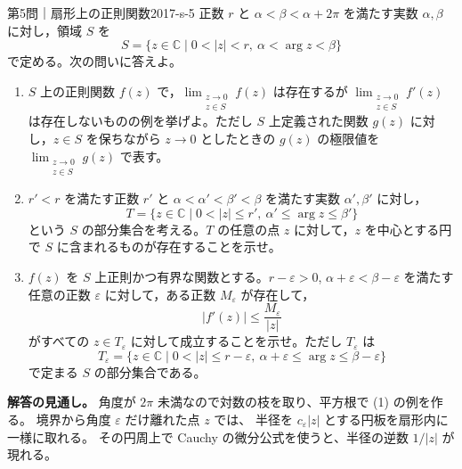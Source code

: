 \begin{problem}{第5問｜扇形上の正則関数}{2017-s-5}
正数 $r$ と $\alpha<\beta<\alpha+2\pi$ を満たす実数 $\alpha,\beta$ に対し，領域 $S$ を
\[
S=\{z\in\mathbb C\mid0<|z|<r,\ \alpha<\arg z<\beta\}
\]
で定める。次の問いに答えよ。
\begin{enumerate}
  \item[(1)] $S$ 上の正則関数 $f(z)$ で，$\displaystyle\lim_{\substack{z\to0\\z\in S}}f(z)$ は存在するが $\displaystyle\lim_{\substack{z\to0\\z\in S}}f'(z)$ は存在しないものの例を挙げよ。ただし $S$ 上定義された関数 $g(z)$ に対し，$z\in S$ を保ちながら $z\to0$ としたときの $g(z)$ の極限値を $\displaystyle\lim_{\substack{z\to0\\z\in S}}g(z)$ で表す。
  \item[(2)] $r'<r$ を満たす正数 $r'$ と $\alpha<\alpha'<\beta'<\beta$ を満たす実数 $\alpha',\beta'$ に対し，
  \[
  T=\{z\in\mathbb C\mid0<|z|\le r',\ \alpha'\le\arg z\le\beta'\}
  \]
  という $S$ の部分集合を考える。$T$ の任意の点 $z$ に対して，$z$ を中心とする円で $S$ に含まれるものが存在することを示せ。
  \item[(3)] $f(z)$ を $S$ 上正則かつ有界な関数とする。$r-\varepsilon>0$, $\alpha+\varepsilon<\beta-\varepsilon$ を満たす任意の正数 $\varepsilon$ に対して，ある正数 $M_\varepsilon$ が存在して，
  \[
  |f'(z)|\le\frac{M_\varepsilon}{|z|}
  \]
  がすべての $z\in T_\varepsilon$ に対して成立することを示せ。ただし $T_\varepsilon$ は
  \[
  T_\varepsilon=\{z\in\mathbb C\mid0<|z|\le r-\varepsilon,\ \alpha+\varepsilon\le\arg z\le\beta-\varepsilon\}
  \]
  で定まる $S$ の部分集合である。
\end{enumerate}
\end{problem}
\begin{memo*}
\textbf{解答の見通し。}
角度が $2\pi$ 未満なので対数の枝を取り、平方根で (1) の例を作る。
境界から角度 $\varepsilon$ だけ離れた点 $z$ では、
半径を $c_\varepsilon|z|$ とする円板を扇形内に一様に取れる。
その円周上で Cauchy の微分公式を使うと、半径の逆数 $1/|z|$ が現れる。
\end{memo*}
